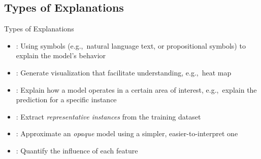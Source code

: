 \documentclass[11pt,dvipsnames,usenames,aspectratio=169]{beamer}  %
\begin{document}
\subsection{Types of Explanations}
\begin{frame}{Types of Explanations}{}
  {\small
    \begin{itemize}[<+->]
      \setlength{\itemsep}{14pt}
      \item \textbf{}: Using symbols (e.g.,~natural language text, or propositional symbols) to explain the model's behavior
      \item \textbf{}: Generate visualization that facilitate understanding, e.g.,~heat map
      \item \textbf{}: Explain how a model operates in a certain area of interest, e.g.,~explain the prediction for a specific instance
      \item \textbf{}: Extract \textit{representative instances} from the training dataset
      \item \textbf{}: Approximate an \textit{opaque} model using a simpler, easier-to-interpret one
      \item \textbf{}: Quantify the influence of each feature
    \end{itemize}
  }
\end{frame}
\end{document}
